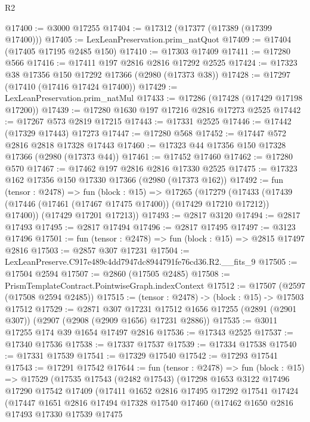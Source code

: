 \begin{lexlean}{R2}
\begin{coremodule}
@17400 := @3000 @17255
@17404 := @17312 (@17377 (@17389 (@17399 @17400)))
@17405 := LexLeanPreservation.prim_natQuot
@17409 := @17404 (@17405 @17195 @2485 @150)
@17410 := @17303 @17409
@17411 := @17280 @566
@17416 := @17411 @197 @2816 @2816 @17292 @2525
@17424 := @17323 @38 @17356 @150 @17292 @17366 (@2980 (@17373 @38))
@17428 := @17297 (@17410 (@17416 @17424 @17400))
@17429 := LexLeanPreservation.prim_natMul
@17433 := @17286 (@17428 (@17429 @17198 @17200))
@17439 := @17280 @1630 @197 @17216 @2816 @17273 @2525
@17442 := @17267 @573 @2819 @17215
@17443 := @17331 @2525
@17446 := @17442 (@17329 @17443) @17273
@17447 := @17280 @568
@17452 := @17447 @572 @2816 @2818 @17328 @17443
@17460 := @17323 @44 @17356 @150 @17328 @17366 (@2980 (@17373 @44))
@17461 := @17452 @17460
@17462 := @17280 @570
@17467 := @17462 @197 @2816 @2816 @17330 @2525
@17475 := @17323 @162 @17356 @150 @17330 @17366 (@2980 (@17373 @162))
@17492 := fun (tensor : @2478) =>
  fun (block : @15) =>
  @17265
    (@17279
      (@17433 (@17439 (@17446 (@17461 (@17467 @17475 @17400)) (@17429 @17210 @17212)) @17400))
      (@17429 @17201 @17213))
@17493 := @2817 @3120
@17494 := @2817 @17493
@17495 := @2817 @17494
@17496 := @2817 @17495
@17497 := @3123 @17496
@17501 := fun (tensor : @2478) => fun (block : @15) => @2815 @17497 @2816
@17503 := @2857 @307 @17231
@17504 := LexLeanPreserve.C917e489c4dd7947dc8944791fe76cd36.R2.__fits_9
@17505 := @17504 @2594
@17507 := @2860 (@17505 @2485)
@17508 := PrismTemplateContract.PointwiseGraph.indexContext
@17512 := @17507 (@2597 (@17508 @2594 @2485))
@17515 := (tensor : @2478) -> (block : @15) -> @17503 @17512
@17529 := @2871
    @307
    @17231
    @17512
    @1656
    @17255
    (@2891 (@2901 @307))
    (@2907 (@2908 (@2909 @1656) @17231 @2886))
@17535 := @3011 @17255 @174 @39 @1654 @17497 @2816
@17536 := @17343 @2525
@17537 := @17340 @17536
@17538 := @17337 @17537
@17539 := @17334 @17538
@17540 := @17331 @17539
@17541 := @17329 @17540
@17542 := @17293 @17541
@17543 := @17291 @17542
@17644 := fun (tensor : @2478) =>
  fun (block : @15) =>
  @17529
    (@17535
      @17543
      (@2482 @17543)
      (@17298
        @1653
        @3122
        @17496
        @17290
        @17542
        @17409
        (@17411
          @1652
          @2816
          @17495
          @17292
          @17541
          @17424
          (@17447
            @1651
            @2816
            @17494
            @17328
            @17540
            @17460
            (@17462
              @1650
              @2816
              @17493
              @17330
              @17539
              @17475

\end{coremodule}
\end{lexlean}
